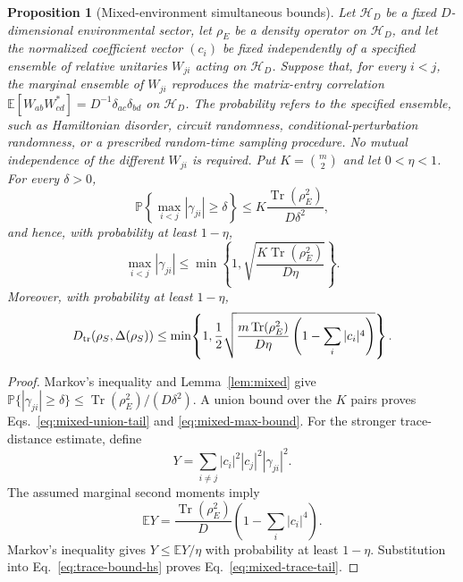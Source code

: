\documentclass[aps,pra,reprint,superscriptaddress,nofootinbib,longbibliography]{revtex4-2}
\newtheorem{proposition}{Proposition}
\newcommand{\Tr}{\operatorname{Tr}}
\newcommand{\HH}{\mathcal{H}}
\newcommand{\E}{\mathbb{E}}
\newcommand{\PP}{\mathbb{P}}
\begin{document}
\begin{proposition}[Mixed-environment simultaneous bounds]
\label{prop:mixed-simultaneous}
Let $\HH_D$ be a fixed $D$-dimensional environmental sector, let $\rho_E$ be
a density operator on $\HH_D$, and let the normalized coefficient vector
$(c_i)$ be fixed independently of a specified ensemble of relative unitaries
$W_{ji}$ acting on $\HH_D$.  Suppose that, for every $i<j$, the marginal
ensemble of $W_{ji}$ reproduces the matrix-entry correlation
$\E[W_{ab}W_{cd}^*]=D^{-1}\delta_{ac}\delta_{bd}$ on $\HH_D$.  The
probability refers to the specified ensemble,
such as Hamiltonian disorder, circuit randomness, conditional-perturbation
randomness, or a prescribed random-time sampling procedure.  No mutual
independence of the different $W_{ji}$ is required.  Put
$K=\binom{m}{2}$ and let $0<\eta<1$.  For every $\delta>0$,
\begin{equation}
 \PP\!\left\{\max_{i<j}|\gamma_{ji}|\geq\delta\right\}
 \leq K\frac{\Tr(\rho_E^2)}{D\delta^2},
 \label{eq:mixed-union-tail}
\end{equation}
and hence, with probability at least $1-\eta$,
\begin{equation}
 \max_{i<j}|\gamma_{ji}|
 \leq
 \min\!\left\{1,
 \sqrt{\frac{K\Tr(\rho_E^2)}{D\eta}}\right\}.
 \label{eq:mixed-max-bound}
\end{equation}
Moreover, with probability at least $1-\eta$,
\begin{equation}
\begin{split}
 D_{\rm tr}\!\left(\rho_S,\Delta(\rho_S)\right)
 \leq \min\!\left\{1,
 \frac12\sqrt{
 \frac{m\Tr(\rho_E^2)}{D\eta}
 \left(1-\sum_i|c_i|^4\right)}\right\}.
 \label{eq:mixed-trace-tail}
\end{split}
\end{equation}
\end{proposition}

\begin{proof}
Markov's inequality and Lemma~\ref{lem:mixed} give
$\PP\{|\gamma_{ji}|\geq\delta\}\leq
\Tr(\rho_E^2)/(D\delta^2)$.  A union bound over the $K$ pairs proves
Eqs.~\eqref{eq:mixed-union-tail} and \eqref{eq:mixed-max-bound}.
For the stronger trace-distance estimate, define
\begin{equation}
 Y=\sum_{i\neq j}|c_i|^2|c_j|^2|\gamma_{ji}|^2.
\end{equation}
The assumed marginal second moments imply
\begin{equation}
 \E Y=\frac{\Tr(\rho_E^2)}{D}
 \left(1-\sum_i|c_i|^4\right).
\end{equation}
Markov's inequality gives $Y\leq\E Y/\eta$ with probability at least
$1-\eta$.  Substitution into Eq.~\eqref{eq:trace-bound-hs} proves
Eq.~\eqref{eq:mixed-trace-tail}.
\end{proof}
\end{document}

